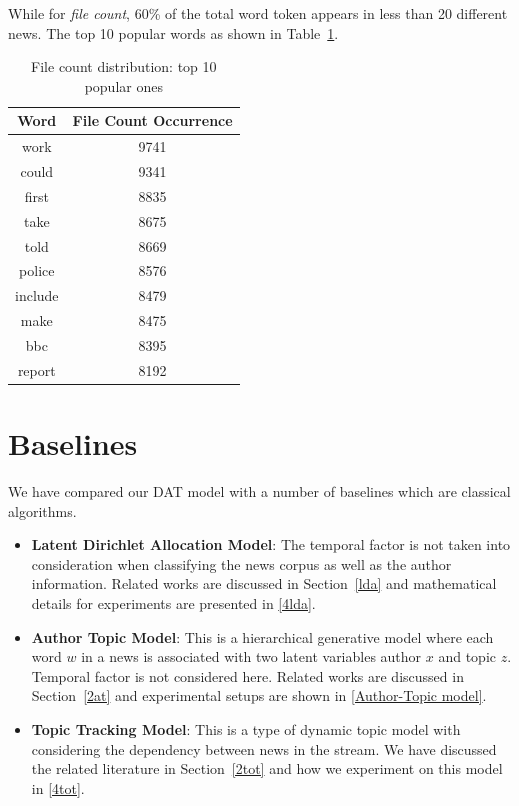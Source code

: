 While for \textit{file count}, 60\% of the total word token appears in less than 20 different news. The top 10 popular words as shown in Table~\ref{filecount}.

\begin{table}[h!]
\centering
 \begin{tabular}{||c c||} 
 \hline
 Word & File Count Occurrence \\ [0.5ex] 
 \hline\hline
work &	9741 \\
could &		9341\\
first &		8835\\
take &		8675\\
told &		8669\\
police	 &	8576\\
include	 &	8479\\
make &		8475\\
bbc	 &	8395\\
report	 &	8192\\ [1ex] 
 \hline
 \end{tabular}
 \caption{File count distribution: top 10 popular ones}
 \label{filecount}
\end{table}


\section{Baselines}
We have compared our DAT model with a number of baselines which are classical algorithms. 
\begin{itemize}
    \item \textbf{Latent Dirichlet Allocation Model}: The temporal factor is not taken into consideration when classifying the news corpus as well as the author information. Related works are discussed in Section~\ref{lda} and mathematical details for experiments are presented in \ref{4lda}.
     \item \textbf{Author Topic Model}: This is a hierarchical generative model where each word
$w$ in a news is associated with two latent variables author $x$ and topic $z$. Temporal factor is not considered here. Related works are discussed in Section~\ref{2at} and experimental setups are shown in \ref{Author-Topic model}.
      \item \textbf{Topic Tracking Model}: This is a type of dynamic topic model with considering the dependency between news in the stream. We have discussed the related literature in Section~\ref{2tot} and how we experiment on this model in \ref{4tot}. 
\end{itemize}

